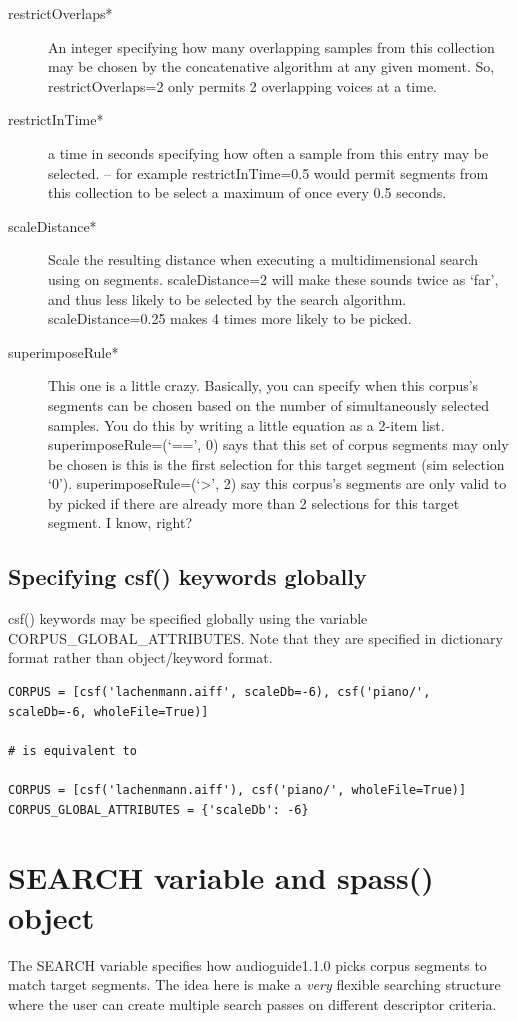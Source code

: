 \documentclass{article}
\newcommand{\ag}{audioguide1.1.0\xspace}
\begin{document}
\begin{spacing}{1.2}
\begin{description}
\item[restrictOverlaps*] An integer specifying how many overlapping samples from this collection may be chosen by the concatenative algorithm at any given moment.  So, restrictOverlaps=2 only permits 2 overlapping voices at a time.

\item[restrictInTime*] a time in seconds specifying how often a sample from this entry may be selected. -- for example restrictInTime=0.5 would permit segments from this collection to be select a maximum of once every 0.5 seconds.

\item[scaleDistance*] Scale the resulting distance when executing a multidimensional search using on segments.  scaleDistance=2 will make these sounds twice as `far', and thus less likely to be selected by the search algorithm.  scaleDistance=0.25 makes 4 times more likely to be picked.

\item[superimposeRule*]  This one is a little crazy.  Basically, you can specify when this corpus's segments can be chosen based on the number of simultaneously selected samples.  You do this by writing a little equation as a 2-item list.  superimposeRule=(`==', 0) says that this set of corpus segments may only be chosen is this is the first selection for this target segment (sim selection `0').  superimposeRule=(`>', 2) say this corpus's segments are only valid to by picked if there are already more than 2 selections for this target segment.  I know, right?
\end{description}


\subsection{Specifying csf() keywords globally}\label{globalcorpus}
csf() keywords may be specified globally using the variable CORPUS\_GLOBAL\_ATTRIBUTES.  Note that they are specified in dictionary format rather than object/keyword format.

\begin{lstlisting}
CORPUS = [csf('lachenmann.aiff', scaleDb=-6), csf('piano/', scaleDb=-6, wholeFile=True)]

# is equivalent to 

CORPUS = [csf('lachenmann.aiff'), csf('piano/', wholeFile=True)]
CORPUS_GLOBAL_ATTRIBUTES = {'scaleDb': -6}
\end{lstlisting}


\section{SEARCH variable and spass() object}
The SEARCH variable specifies how \ag picks corpus segments to match target segments.  The idea here is make a \emph{very} flexible searching structure where the user can create multiple search passes on different descriptor criteria.


\end{spacing}
\end{document}

